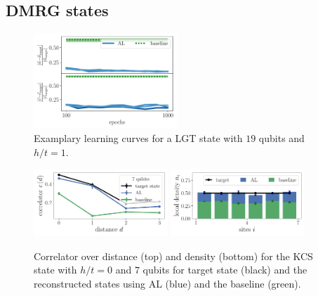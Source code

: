 \documentclass[pra,aps,showpacs,groupedaddress,superscriptaddress,twocolumn,toc=flat,biblatex,footinbib]{revtex4-1}
\begin{document}
\subsection{DMRG states \label{appendix:MPS}}



\begin{figure}[t]
	\centering
  \includegraphics[width=0.48\textwidth]{Fig14.pdf}
	\caption[]{Examplary learning curves for a LGT state with $19$ qubits and $h/t=1$.}
	\label{fig:Example4}
\end{figure}

\begin{figure}[t]
	\centering
   \includegraphics[width=0.45\textwidth]{Fig15a.pdf}
   \includegraphics[width=0.45\textwidth]{Fig15b.pdf}
	\caption[]{Correlator over distance (top) and density (bottom) for the KCS state with $h/t=0$ and $7$ qubits for target state (black) and the reconstructed states using AL (blue) and the baseline (green).}
	\label{fig:LGT_h=0_3}
\end{figure}
\end{document}
